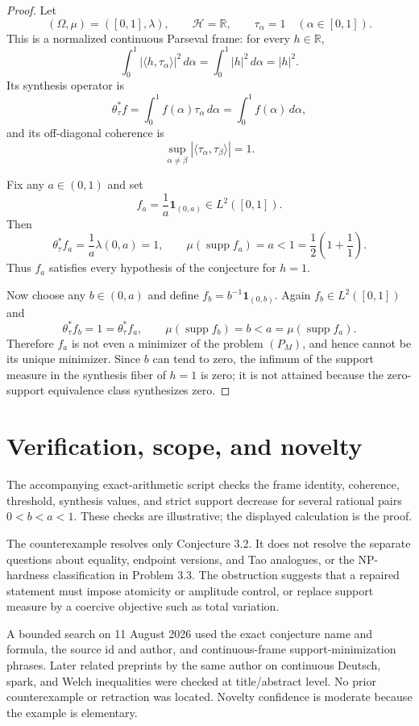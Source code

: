 \documentclass[10pt]{article}
\newcommand{\Hh}{\mathcal H}
\newcommand{\supp}{\operatorname{supp}}
\begin{document}
\begin{proof}
Let
\[
 (\Omega,\mu)=([0,1],\lambda),\qquad \Hh=\mathbb R,
 \qquad \tau_\alpha=1\quad(\alpha\in[0,1]).
\]
This is a normalized continuous Parseval frame: for every $h\in\mathbb R$,
\[
 \int_0^1|\langle h,\tau_\alpha\rangle|^2\,d\alpha
 =\int_0^1|h|^2\,d\alpha=|h|^2.
\]
Its synthesis operator is
\[
 \theta_\tau^*f=\int_0^1 f(\alpha)\tau_\alpha\,d\alpha
 =\int_0^1 f(\alpha)\,d\alpha,
\]
and its off-diagonal coherence is
\[
 \sup_{\alpha\ne\beta}|\langle\tau_\alpha,\tau_\beta\rangle|=1.
\]

Fix any $a\in(0,1)$ and set
\[
 f_a=\frac1a\mathbf 1_{(0,a)}\in L^2([0,1]).
\]
Then
\[
 \theta_\tau^*f_a=\frac1a\lambda(0,a)=1,
 \qquad \mu(\supp f_a)=a<1
 =\frac12\left(1+\frac11\right).
\]
Thus $f_a$ satisfies every hypothesis of the conjecture for $h=1$.

Now choose any $b\in(0,a)$ and define
$f_b=b^{-1}\mathbf1_{(0,b)}$.  Again $f_b\in L^2([0,1])$ and
\[
 \theta_\tau^*f_b=1=\theta_\tau^*f_a,
 \qquad \mu(\supp f_b)=b<a=\mu(\supp f_a).
\]
Therefore $f_a$ is not even a minimizer of the problem $(P_M)$, and hence
cannot be its unique minimizer.  Since $b$ can tend to zero, the infimum of
the support measure in the synthesis fiber of $h=1$ is zero; it is not
attained because the zero-support equivalence class synthesizes zero.
\end{proof}

\section{Verification, scope, and novelty}

The accompanying exact-arithmetic script checks the frame identity, coherence,
threshold, synthesis values, and strict support decrease for several rational
pairs $0<b<a<1$.  These checks are illustrative; the displayed calculation is
the proof.

The counterexample resolves only Conjecture 3.2.  It does not resolve the
separate questions about equality, endpoint versions, and Tao analogues, or
the NP-hardness classification in Problem 3.3.  The obstruction suggests that a repaired
statement must impose atomicity or amplitude control, or replace support
measure by a coercive objective such as total variation.

A bounded search on 11 August 2026 used the exact conjecture name and formula,
the source id and author, and continuous-frame support-minimization phrases.
Later related preprints by the same author on continuous Deutsch, spark, and
Welch inequalities were checked at title/abstract level. No prior
counterexample or retraction was located. Novelty confidence is moderate
because the example is elementary.
\end{document}
